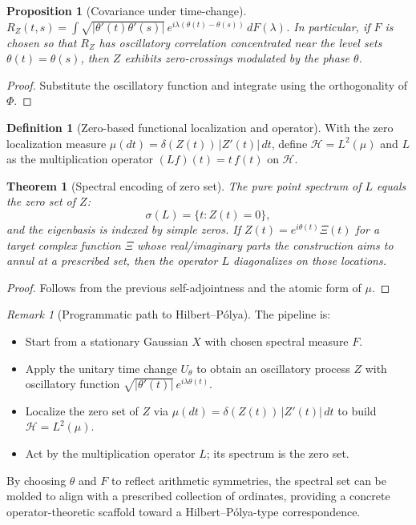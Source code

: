 \documentclass[12pt]{article}
\newtheorem{theorem}{Theorem}
\newtheorem{proposition}{Proposition}
\theoremstyle{definition}
\newtheorem{definition}{Definition}
\theoremstyle{remark}
\newtheorem{remark}{Remark}
\begin{document}
\begin{proposition}[Covariance under time-change]
$R_Z(t,s)=\int \sqrt{|\theta'(t)\theta'(s)|}\,e^{i\lambda(\theta(t)-\theta(s))}\,dF(\lambda)$. In particular, if $F$ is chosen so that $R_Z$ has oscillatory correlation concentrated near the level sets $\theta(t)=\theta(s)$, then $Z$ exhibits zero-crossings modulated by the phase $\theta$.
\end{proposition}

\begin{proof}
Substitute the oscillatory function and integrate using the orthogonality of $\Phi$.
\end{proof}

\begin{definition}[Zero-based functional localization and operator]
With the zero localization measure $\mu(dt)=\delta(Z(t))\,|Z'(t)|\,dt$, define $\mathcal{H}=L^2(\mu)$ and $L$ as the multiplication operator $(Lf)(t)=t\,f(t)$ on $\mathcal{H}$.
\end{definition}

\begin{theorem}[Spectral encoding of zero set]
The pure point spectrum of $L$ equals the zero set of $Z$:
\[
\sigma(L)=\{t: Z(t)=0\},
\]
and the eigenbasis is indexed by simple zeros. If $Z(t)=e^{i\theta(t)}\Xi(t)$ for a target complex function $\Xi$ whose real/imaginary parts the construction aims to annul at a prescribed set, then the operator $L$ diagonalizes on those locations.
\end{theorem}

\begin{proof}
Follows from the previous self-adjointness and the atomic form of $\mu$.
\end{proof}

\begin{remark}[Programmatic path to Hilbert--P\'olya]
The pipeline is:
\begin{itemize}
\item Start from a stationary Gaussian $X$ with chosen spectral measure $F$.
\item Apply the unitary time change $U_\theta$ to obtain an oscillatory process $Z$ with oscillatory function $\sqrt{|\theta'(t)|}\,e^{i\lambda \theta(t)}$.
\item Localize the zero set of $Z$ via $\mu(dt)=\delta(Z(t))\,|Z'(t)|\,dt$ to build $\mathcal{H}=L^2(\mu)$.
\item Act by the multiplication operator $L$; its spectrum is the zero set.
\end{itemize}
By choosing $\theta$ and $F$ to reflect arithmetic symmetries, the spectral set can be molded to align with a prescribed collection of ordinates, providing a concrete operator-theoretic scaffold toward a Hilbert--P\'olya-type correspondence.
\end{remark}
\end{document}
